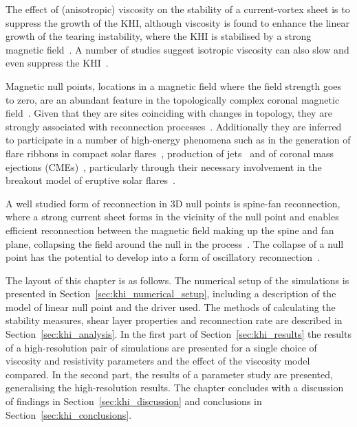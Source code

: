 The effect of (anisotropic) viscosity on the stability of a current-vortex sheet is to suppress the growth of the KHI, although viscosity is found to enhance the linear growth of the tearing instability, where the KHI is stabilised by a strong magnetic field~\cite{einaudiResistiveInstabilitiesFlowing1989}. A number of studies suggest isotropic viscosity can also slow and even suppress the KHI~\cite{howsonEffectsResistivityViscosity2017,roedigerViscousKelvinHelmholtzInstabilities2013a,wyperKelvinHelmholtzInstabilityCurrentvortex2013}.

Magnetic null points, locations in a magnetic field where the field strength goes to zero, are an abundant feature in the topologically complex coronal magnetic field~\cite{edwardsNullPointDistribution2015}. Given that they are sites coinciding with changes in topology, they are strongly associated with reconnection processes~\cite{yangImagingSpectralStudy2020,sunHOTSPINELOOPS2013}. Additionally they are inferred to participate in a number of high-energy phenomena such as in the generation of flare ribbons in compact solar flares~\cite{massonNATUREFLARERIBBONS2009,pontinWhyAreFlare2016a}, production of jets~\cite{moreno-insertisPLASMAJETSERUPTIONS2013} and of coronal mass ejections (CMEs)~\cite{barnesRelationshipCoronalMagnetic2007,zouContinuousNullPointMagnetic2020}, particularly through their necessary involvement in the breakout model of eruptive solar flares~\cite{macleanTopologicalAnalysisMagnetic2005}.

A well studied form of reconnection in 3D null points is spine-fan reconnection, where a strong current sheet forms in the vicinity of the null point and enables efficient reconnection between the magnetic field making up the spine and fan plane, collapsing the field around the null in the process~\cite{thurgoodImplosiveCollapseMagnetic2018}. The collapse of a null point has the potential to develop into a form of oscillatory reconnection~\cite{thurgoodThreedimensionalOscillatoryMagnetic2017}.

The layout of this chapter is as follows. The numerical setup of the simulations is presented in Section~\ref{sec:khi_numerical_setup}, including a description of the model of linear null point and the driver used. The methods of calculating the stability measures, shear layer properties and reconnection rate are described in Section~\ref{sec:khi_analysis}. In the first part of Section~\ref{sec:khi_results} the results of a high-resolution pair of simulations are presented for a single choice of viscosity and resistivity parameters and the effect of the viscosity model compared. In the second part, the results of a parameter study are presented, generalising the high-resolution results. The chapter concludes with a discussion of findings in Section~\ref{sec:khi_discussion} and conclusions in Section~\ref{sec:khi_conclusions}.

